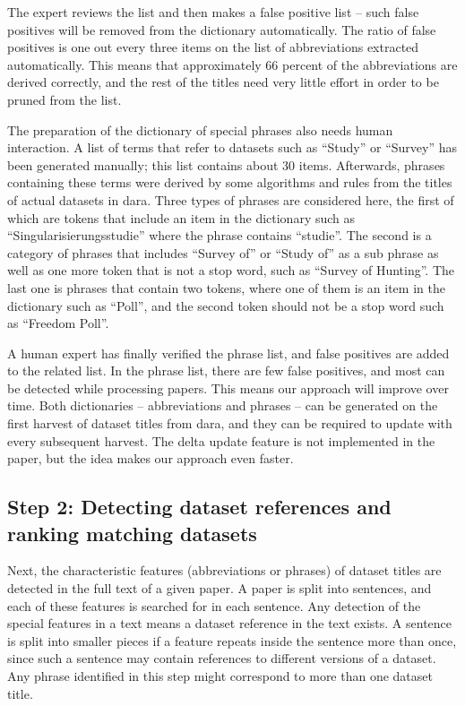 \documentclass{IOS-Book-Article}
\newcommand{\dara}{\textsf{da\textbar ra}}
\begin{document}
The expert reviews the list and then makes a false positive list -- such false positives will be removed from the dictionary automatically. The ratio of false positives is one out every three items on the list of abbreviations extracted automatically. This means that approximately 66 percent of the abbreviations are derived correctly, and the rest of the titles need very little effort in order to be pruned from the list.

The preparation of the dictionary of special phrases also needs human interaction. A list of terms that refer to datasets such as \enquote{Study} or \enquote{Survey} has been generated manually; this list contains about 30 items. Afterwards, phrases containing these terms were derived by some algorithms and rules from the titles of actual datasets in {\dara}. Three types of phrases are considered here, the first of which are tokens that include an item in the dictionary such as \enquote{Singularisierungsstudie} where the phrase contains \enquote{studie}.
The second is a category of phrases that includes \enquote{Survey of} or \enquote{Study of} as a sub phrase as well as one more token that is not a stop word, such as \enquote{Survey of Hunting}.
The last one is phrases that contain two tokens, where one of them is an item in the dictionary such as \enquote{Poll}, and the second token should not be a stop word such as \enquote{Freedom Poll}. 

A human expert has finally verified the phrase list, and false positives are added to the related list. In the phrase list, there are few false positives, and most can be detected while processing papers. This means our approach will improve over time.
Both dictionaries -- abbreviations and phrases -- can be generated on the first harvest of dataset titles from {\dara}, and they can be required to update with every subsequent harvest. The delta update feature is not implemented in the paper, but the idea makes our approach even faster.
 
\subsection{Step 2: Detecting dataset references and ranking matching datasets}
\label{sec:detecting-ranking}
Next, the characteristic features (abbreviations or phrases) of dataset titles are detected in the full text of a given paper. A paper is split into sentences, and each of these features is searched for in each sentence. 
Any detection of the special features in a text means a dataset reference in the text exists.
A sentence is split into smaller pieces if a feature repeats inside the sentence more than once, since such a sentence may contain references to different versions of a dataset. Any phrase identified in this step might correspond to more than one dataset title.
\end{document}
